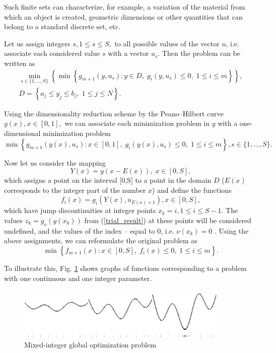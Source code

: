 \documentclass[
11pt,%
tightenlines,%
twoside,%
onecolumn,%
nofloats,%
nobibnotes,%
nofootinbib,%
superscriptaddress,%
noshowpacs,%
centertags]%
{revtex4}
\begin{document}
Such finite sets can characterize, for example, a variation of the material from which an object is created, geometric dimensions or other quantities that can belong to a standard discrete set, etc.


Let us assign integers  $s, 1\leq s \leq S,$ to all possible values of the vector $u$, i.e. associate each considered value $s$ with a vector $u_s$.
Then the problem can be written as
\begin{gather}\label{problem_is}
 \min_{s\in\{1,...,S\}}\left\{\min{\left\{ g_{m+1}(y,u_s):y\in D, \; g_i(y,u_s)\leq 0, \; 1 \leq i \leq m\right\}}\right\},\\
 D=\left\{ a_j\leq y_j \leq b_j, \; 1 \leq j\leq N \right\}.\nonumber
\end{gather}

Using the dimensionality reduction scheme by the Peano--Hilbert
curve $y(x), x\in [0,1],$ we can associate each minimization problem
in $y$ with a one-dimensional minimization problem
\[
 \min{\left\{ g_{m+1}(y(x),u_s):x \in [0,1], \; g_i(y(x),u_s)\leq 0, \; 1 \leq i \leq m\right\}}, s\in\{1,...,S\}.
\]

Now let us consider the mapping
\[
Y(x)=y(x-E(x)), \; x\in[0,S],
\]
which assigns a point on the interval  [0,S] to a point in the domain $D$ ($E(x)$ corresponds to the integer part of the number $x$) and define the functions
\[
f_i(x) = g_i(Y(x),u_{E(x)+1}), x\in[0,S],
\]
which have jump discontinuities at integer points $x_k = i, 1\leq i
\leq S-1$. The values $z_k = g_\nu(y(x_k))$ from
(\ref{trial_result}) at these points will be considered undefined,
and the values of the index -- equal to 0, i.e. $\nu(x_k) = 0$ .
Using the above assignments, we can reformulate the original problem
as
\begin{equation}\label{problem_is1}
\min \left\{f_{m+1}(x): x \in [0,S], \; f_i(x) \leq 0, \; 1 \leq i \leq m\right\}.
\end{equation}

To illustrate this, Fig. \ref{fig:1} shows graphs of functions corresponding to a problem with one continuous and one integer parameter.
\begin{figure}[ht]
    \centering
    \includegraphics[width=0.9\textwidth]{fig1.jpg}
    \caption{Mixed-integer global optimization problem}
    \label{fig:1}
\end{figure}
\end{document}

